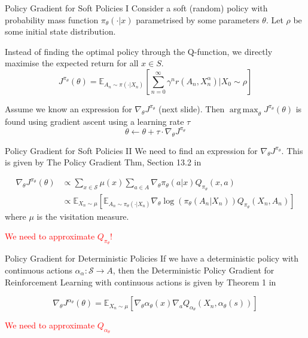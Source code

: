 \documentclass{beamer}
\newcommand{\red}[1]{\textcolor{red}{#1}}
\DeclareMathOperator*{\argmax}{arg\,max}
\begin{document}
\begin{frame}{Policy Gradient for Soft Policies I}
Consider a soft (random) policy with probability mass function $\pi_\theta(\cdot | x)$ parametrised by some parameters $\theta$. Let $\rho$ be some initial state distribution.  	
	
	Instead of finding the optimal policy through the Q-function, we directly maximise the expected return for all $x\in S$.
	\[
		J^{\pi_\theta}(\theta) = \mathbb E_{A_n\sim \pi(\cdot|X_n)} \left [ \sum_{n=0}^\infty \gamma^n r(A_n, X_n^\alpha) \bigg \vert X_0\sim \rho\right]
	\]
	
Assume we know an expression for $\nabla_\theta J^{\pi_\theta}$ (next slide). Then $\argmax_{\theta} J^{\pi_\theta}(\theta)$
is found using gradient ascent using a learning rate $\tau$
\[
\theta \leftarrow \theta + \tau \cdot \nabla_\theta J^{\pi_\theta}
\]
\end{frame}

\begin{frame}{Policy Gradient for Soft Policies II}
	 We need to find an expression for $\nabla_\theta J^{\pi_\theta}$. This is given by The Policy Gradient Thm, Section 13.2 in ~\cite{sutton2018reinforcement}
	\begin{Theorem}
		\[
		\begin{split}
		\nabla_\theta J^{\pi_\theta}(\theta) &  \propto \sum_{x\in\mathcal S} \mu(x) \sum_{a\in A} \nabla_\theta \pi_\theta(a|x) Q_{\pi_\theta}(x,a)  \\ 
		 & \propto \mathbb E_{X_n\sim \mu} \left[ \mathbb E_{A_n\sim \pi_\theta(\cdot|X_n)} \nabla_\theta \log (\pi_\theta(A_n | X_n)) Q_{\pi_\theta}(X_n,A_n)\right]
		\end{split}
		\]
		where $\mu$ is the visitation measure. 
	\end{Theorem}
	\red{We need to approximate $Q_{\pi_\theta}$!}
\end{frame}


\begin{frame}{Policy Gradient for Deterministic Policies}
If we have a deterministic policy with continuous actions $\alpha_\alpha: \mathcal S \rightarrow A$, then the
Deterministic Policy Gradient for Reinforcement Learning with continuous actions is given by Theorem 1 in ~\cite{silver2014deterministic}
\begin{Theorem}
\[
\nabla_\theta J^{\alpha_\theta}(\theta) = \mathbb E_{X_n\sim \mu} \left[ \nabla_\theta \alpha_\theta(x) \nabla_a Q_{\alpha_\theta}(X_n, \alpha_\theta(s)) \right]
\]	
\end{Theorem}
\red{We need to approximate $Q_{\alpha_\theta}$}
\end{frame}
\end{document}
